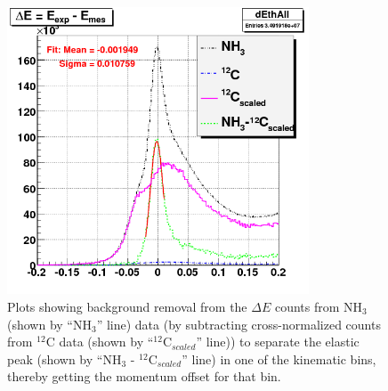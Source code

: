 \begin{figure}[H]%
\centering
  \leavevmode \includegraphics[width=0.8\textwidth]{figuresEG4/FigKineCor/dE_elastProdEb3.png} 
  \caption[Background removal from $\Delta E$]{Plots showing background removal from the $\Delta E$ counts from NH$_3$ 
(shown by ``NH$_3$'' line) data (by subtracting cross-normalized counts from $^{12}$C data (shown by ``$^{12}$C$_{scaled}$'' 
line)) to separate the elastic peak (shown by ``NH$_3$ - $^{12}$C$_{scaled}$'' line) in one of the kinematic bins, thereby 
getting the momentum offset for that bin.}
\label{sec6dEall}
\end{figure}



